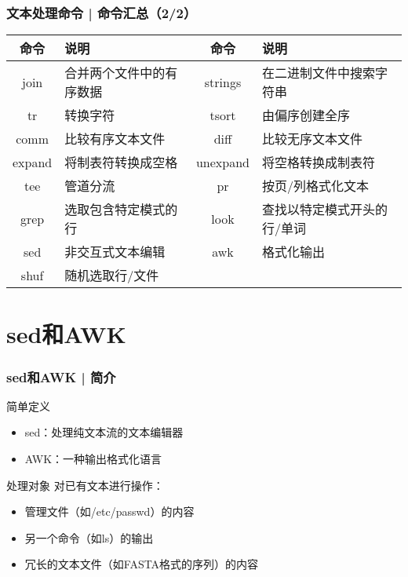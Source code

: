 \begin{frame}
  \frametitle{文本处理命令 | 命令汇总（2/2）}
  \begin{table}
    \centering
    \begin{tabularx}{\textwidth}{cX|cX}
      \hline
      \rowcolor{blue!50}命令 & 说明 & 命令 & 说明\\
      \hline
      join & 合并两个文件中的有序数据 & strings & 在二进制文件中搜索字符串\\
      tr & 转换字符 & tsort & 由偏序创建全序\\
      comm & 比较有序文本文件 & diff & 比较无序文本文件\\
      expand & 将制表符转换成空格 & unexpand & 将空格转换成制表符\\
      tee & 管道分流 & pr & 按页/列格式化文本\\
      grep & 选取包含特定模式的行 & look & 查找以特定模式开头的行/单词\\
      sed & 非交互式文本编辑 & awk & 格式化输出\\
      shuf & 随机选取行/文件 & & \\
      \hline
    \end{tabularx}
  \end{table}
\end{frame}

\section{sed和AWK}
\begin{frame}
  \frametitle{sed和AWK | 简介}
  \begin{block}{简单定义}
    \begin{itemize}
      \item sed：处理纯文本流的文本编辑器
      \item AWK：一种输出格式化语言
    \end{itemize}
  \end{block}
  \pause
  \begin{block}{处理对象}
    对已有文本进行操作：
    \begin{itemize}
      \item 管理文件（如/etc/passwd）的内容
      \item 另一个命令（如ls）的输出
      \item 冗长的文本文件（如FASTA格式的序列）的内容
    \end{itemize}
  \end{block}
\end{frame}

